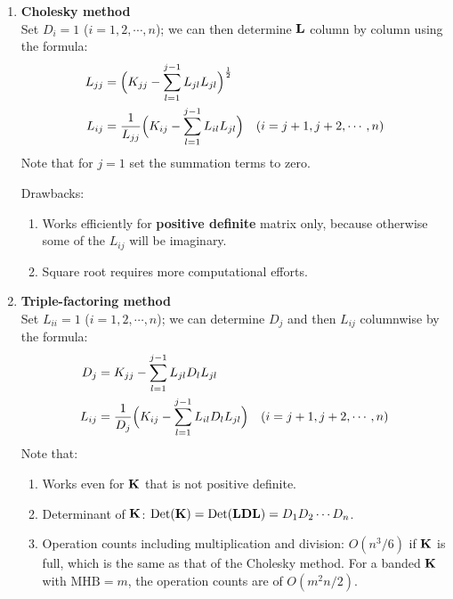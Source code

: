 \begin{enumerate}[leftmargin=*]
  \item \textbf{Cholesky method}\\
    Set $D_i = 1$ ($i = 1,2,\cdots,n$); we can then determine $\mathbf{L}$ column by column using the formula:
    \begin{align}
      L_{jj} &= \Bigl(K_{jj} - \sum_{l=1}^{j-1}L_{jl}L_{jl}\Bigr)^{\frac12}\\
      L_{ij} &= \frac{1}{L_{jj}}\Bigl(K_{ij} - \sum_{l=1}^{j-1}L_{il}L_{jl}\Bigr)\quad(i = j+1, j+2,\cdots,n)
    \end{align}
    Note that for $j = 1$ set the summation terms to zero.

    Drawbacks:
    \begin{enumerate}[label=(\alph*)]
      \item Works efficiently for \textbf{positive definite} matrix only, because otherwise some of the $L_{ij}$ will be imaginary.
      \item Square root requires more computational efforts.
    \end{enumerate}

  \item \textbf{Triple-factoring method}\\
    Set $L_{ii} = 1$ ($i = 1,2,\cdots,n$); we can determine $D_j$ and then $L_{ij}$ columnwise by the formula:
    \begin{align}
      D_j &= K_{jj} - \sum_{l=1}^{j-1}L_{jl}D_lL_{jl}\\
      L_{ij} &= \frac{1}{D_j}\Bigl(K_{ij} - \sum_{l=1}^{j-1}L_{il}D_lL_{jl}\Bigr)\quad(i = j+1, j+2,\cdots,n)
    \end{align}
    Note that:
    \begin{enumerate}[label=(\alph*)]
      \item Works even for $\mathbf{K}$ that is not positive definite.
      \item Determinant of $\mathbf{K}$: $\operatorname{Det}(\mathbf{K}) = \operatorname{Det}(\mathbf{L}\mathbf{D}\mathbf{L}) = D_1D_2\cdots D_n$.
      \item Operation counts including multiplication and division: $O(n^3/6)$ if $\mathbf{K}$ is full, which is the same as that of the Cholesky method. For a banded $\mathbf{K}$ with $\text{MHB} = m$, the operation counts are of $O(m^2n/2)$.
    \end{enumerate}
\end{enumerate}
